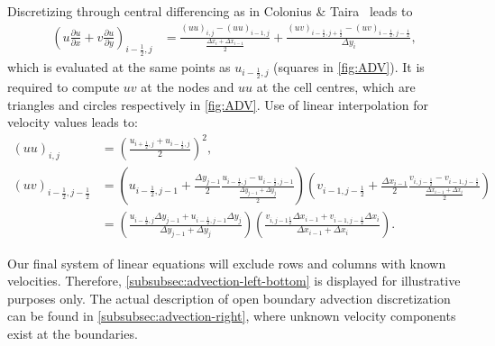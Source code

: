 \documentclass{article}
\numberwithin{equation}{section}
\begin{document}
Discretizing through central differencing as in Colonius \& Taira~\cite{Colonius:2008} leads to
\begin{align}\label{eqn:adv-inner}
	\left (u\frac{\partial u}{\partial x}+v \frac{\partial u}{\partial y}\right)_{i-\frac{1}{2},j}&=\frac{(uu)_{i
	,j}-(uu)_{i- 1,j}}{\frac{\Delta x_i+\Delta x_{i-1}}{2}}+\frac{(uv)_{i-\frac{1}{2},j+\frac{1}{2}}-(uv)_{i-\frac{1}{2},j-\frac{1}{2}}}{\Delta y_i},
\end{align}
which is evaluated at the same points as $u_{i-\frac{1}{2},j}$ (squares in \cref{fig:ADV}). It is required to compute $uv$ at the nodes and $uu$ at the cell centres, which are triangles and circles respectively in \cref{fig:ADV}. Use of linear interpolation for velocity values leads to:
\begin{align*}
  (uu)_{i,j}&=\left(\frac{u_{i+\frac{1}{2},j}+u_{i-\frac{1}{2},j}}{2}\right)^2,\\
  (uv)_{i-\frac{1}{2},j-\frac{1}{2}}&=\left(u_{i-\frac{1}{2},j-1} + \frac{\Delta y_{j-1}}{2}\frac{u_{i-\frac{1}{2},j}-u_{i-\frac{1}{2},j-1}}{\frac{\Delta y_{j-1} +\Delta y_j}{2}} \right) \left( v_{i-1,j-\frac{1}{2}} + \frac{\Delta x_{i-1}}{2}\frac{v_{i,j-\frac{1}{2}}-v_{i-1,j-\frac{1}{2}}}{\frac{\Delta x_{i-1} +\Delta x_i}{2}}\right)\\
  &=\left(\frac{u_{i-\frac{1}{2},j}\Delta y_{j-1} +u_{i-\frac{1}{2},j-1}\Delta y_j}{\Delta y_{j-1}+\Delta y_{j}}\right )\left ( \frac{v_{i,j-1\frac{1}{2}}\Delta x_{i-1} +v_{i-1,j-\frac{1}{2}}\Delta x_i}{\Delta x_{i-1}+\Delta x_{i}}\right).
\end{align*}

Our final system of linear equations will exclude rows and columns with known velocities. Therefore, \cref{subsubsec:advection-left-bottom} is displayed for illustrative purposes only. The actual description of open boundary advection discretization can be found in \cref{subsubsec:advection-right}, where unknown velocity components exist at the boundaries.
\end{document}
